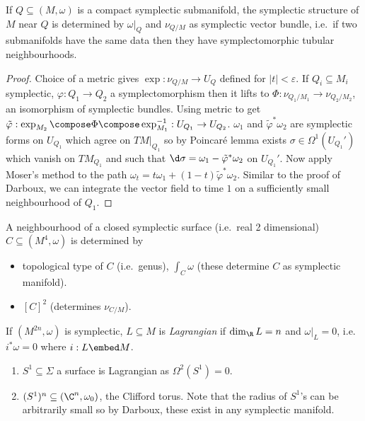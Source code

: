 \documentclass[a4paper]{article}
\begin{document}
\begin{theorem}
  If \(Q \subseteq (M, \omega)\) is a compact symplectic submanifold, the symplectic structure of \(M\) near \(Q\) is determined by \(\omega|_Q\) and \(\nu_{Q/M}\) as symplectic vector bundle, i.e.\ if two submanifolds have the same data then they have symplectomorphic tubular neighbourhoods.
\end{theorem}

\begin{proof}
  Choice of a metric gives \(\exp: \nu_{Q/M} \to U_Q\) defined for \(|t| < \varepsilon\). If \(Q_i \subseteq M_i\) symplectic, \(\varphi: Q_1 \to Q_2\) a symplectomorphism then it lifts to \(\Phi: \nu_{Q_1/M_1} \to \nu_{Q_2/M_2}\), an isomorphism of symplectic bundles. Using metric to get \(\tilde \varphi: \exp_{M_2} \compose \Phi \compose \exp_{M_1}^{-1}: U_{Q_1} \to U_{Q_2}\). \(\omega_1\) and \(\tilde \varphi^* \omega_2\) are symplectic forms on \(U_{Q_1}\) which agree on \(TM|_{Q_1}\) so by Poincaré lemma exists \(\sigma \in \Omega^1(U_{Q_1}')\) which vanish on \(TM_{Q_1}\) and such that \(\d \sigma = \omega_1 - \tilde \varphi^* \omega_2\) on \(U_{Q_1}'\). Now apply Moser's method to the path \(\omega_t = t\omega_1 + (1 - t)\tilde \varphi^* \omega_2\). Similar to the proof of Darboux, we can integrate the vector field to time \(1\) on a sufficiently small neighbourhood of \(Q_1\).
\end{proof}

\begin{corollary}
  A neighbourhood of a closed symplectic surface (i.e.\ real 2 dimensional) \(C \subseteq (M^4, \omega)\) is determined by
  \begin{itemize}
  \item topological type of \(C\) (i.e.\ genus), \(\int_C \omega\) (these determine \(C\) as symplectic manifold).
  \item \([C]^2\) (determines \(\nu_{C/M}\)).
  \end{itemize}
\end{corollary}

\begin{definition}
  If \((M^{2n}, \omega)\) is symplectic, \(L \subseteq M\) is \emph{Lagrangian} if \(\dim_\R L = n\) and \(\omega|_L = 0\), i.e.\ \(i^* \omega = 0\) where \(i: L \embed M\).
\end{definition}

\begin{eg}\leavevmode
  \begin{enumerate}
  \item \(S^1 \subseteq \Sigma\) a surface is Lagrangian as \(\Omega^2(S^1) = 0\).
  \item \((S^1)^n \subseteq (\C^n, \omega_0)\), the Clifford torus. Note that the radius of \(S^1\)'s can be arbitrarily small so by Darboux, these exist in any symplectic manifold.
  \end{enumerate}
\end{eg}
\end{document}
